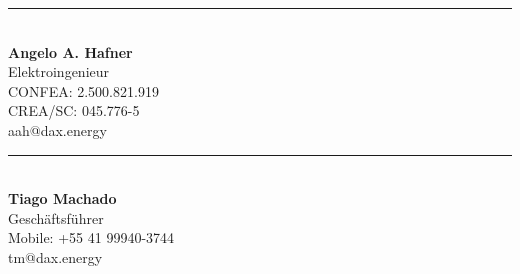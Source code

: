\documentclass[a4paper]{article}
\begin{document}
\noindent %
\begin{minipage}[t]{0.5\textwidth} %
	\centering %
	\vspace{5cm} %
	\rule{6cm}{0.4pt}\\ %
	\textbf{Angelo A. Hafner}\\ %
	Elektroingenieur\\ %
	CONFEA: 2.500.821.919\\ %
	CREA/SC: 045.776-5\\ %
	aah@dax.energy %
\end{minipage}%
\hfill %
\begin{minipage}[t]{0.5\textwidth} %
	\centering %
	\vspace{5cm} %
	\rule{6cm}{0.4pt}\\ %
	\textbf{Tiago Machado}\\ %
	Geschäftsführer\\ %
	Mobile: +55 41 99940-3744\\ %
	tm@dax.energy %
\end{minipage}
\end{document}
